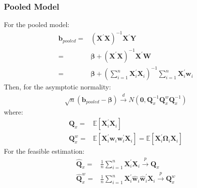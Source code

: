 \documentclass{article}
\begin{document}
\subsubsection{Pooled Model}
For the pooled model:
	\begin{align*}
		\boldsymbol{b}_{pooled} = & (\boldsymbol{X}^\prime \boldsymbol{X})^{-1} \boldsymbol{X}^\prime \boldsymbol{Y}\\ = &
		\boldsymbol{\beta} + (\boldsymbol{X}^\prime \boldsymbol{X})^{-1} \boldsymbol{X}^\prime \boldsymbol{W}\\ = &
		\boldsymbol{\beta} + (\sum^n_{i=1} \boldsymbol{X}^\prime_i \boldsymbol{X}_i)^{-1} \sum^n_{i=1} \boldsymbol{X}^\prime_i \boldsymbol{w}_i
	\end{align*}
Then, for the asymptotic normality:
	\begin{align*}
		\sqrt{n}(\boldsymbol{b}_{pooled} - \boldsymbol{\beta}) \xrightarrow{d} N(\boldsymbol{0}, \boldsymbol{Q}^{-1}_x \boldsymbol{Q}^w_x \boldsymbol{Q}^{-1}_x)
	\end{align*}
where:
	\begin{align*}
		\boldsymbol{Q}_x = &\mathbb{E} [\boldsymbol{X}^\prime_i \boldsymbol{X}_i]\\
		\boldsymbol{Q}^w_x = &\mathbb{E} [\boldsymbol{X}^\prime_i \boldsymbol{w}_i \boldsymbol{w}^\prime_i \boldsymbol{X}_i] = \mathbb{E} [\boldsymbol{X}^\prime_i \boldsymbol{\Omega}_i \boldsymbol{X}_i]
	\end{align*}
For the feasible estimation:
	\begin{align*}
		\hat{\boldsymbol{Q}}_x = &\frac{1}{n} \sum^n_{i=1} \boldsymbol{X}^\prime_i \boldsymbol{X}_i \xrightarrow{p} \boldsymbol{Q}_x\\
		\hat{\boldsymbol{Q}}^w_x = &\frac{1}{n} \sum^n_{i=1} \boldsymbol{X}^\prime_i \hat{\boldsymbol{w}}_i \hat{\boldsymbol{w}}^\prime_i \boldsymbol{X}_i \xrightarrow{p} \boldsymbol{Q}^w_x
	\end{align*}
\end{document}
